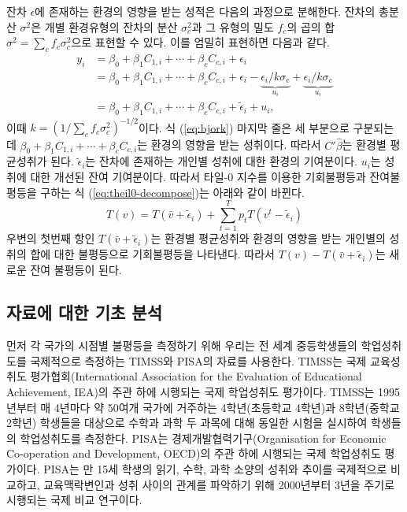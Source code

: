 잔차 $\epsilon$에 존재하는 환경의 영향을 받는 성적은 다음의 과정으로 분해한다.
잔차의 총분산 $\sigma ^2$은 개별 환경유형의 잔차의 분산 $\sigma _c^2$과 그 유형의 밀도 $f_c$의 곱의 합 $\sigma ^2 =  \sum _c f_c \sigma ^2 _c$으로 표현할 수 있다. 
이를 엄밀히 표현하면 다음과 같다.
\begin{equation}
\label{eq:bjork}
 \begin{aligned} y_{i} &= \beta _0 +  \beta _1 C_{1,i} + \cdots + \beta _c C_{c,i} + \epsilon_{i} \\ &= \beta _0 +  \beta _1 C_{1,i} + \cdots + \beta _c C_{c,i} +\epsilon_{i}-\underbrace{\epsilon_{i} / k \sigma_{c}}_{u_{i}}+\underbrace{\epsilon_{i} / k \sigma_{c}}_{u_{i}} \\ &= \beta _0 +  \beta _1 C_{1,i} + \cdots + \beta _c C_{c,i} +\widetilde{\epsilon}_{i}+u_{i}, \end{aligned}
\end{equation}
이때 $k = ( 1 / \sum _c f _c \sigma ^2 _c ) ^{-1/2}$이다.
식 (\ref{eq:bjork}) 마지막 줄은 세 부분으로 구분되는데 $\beta _0 +  \beta _1 C_{1,i} + \cdots + \beta _c C_{c,i}$는 환경의 영향을 받는 성취이다. 따라서 $C'\hat{\beta}$는 환경별 평균성취가 된다. $\widetilde{\epsilon}_{i}$는 잔차에 존재하는 개인별 성취에 대한 환경의 기여분이다. $u_i$는 성취에 대한 개선된 잔여 기여분이다.
따라서 타일-0 지수를 이용한 기회불평등과 잔여불평등을 구하는 식 (\ref{eq:theil0-decompose})는 아래와 같이 바뀐다.
\begin{equation}
 \label{eq:theil0-bjork}  
  T(v)=T(\bar{v}+\widetilde{\epsilon}_i)+ \sum_{t=1}^{T} p_{t} T\left(v^{t}-\widetilde{\epsilon}_i\right)
\end{equation}
우변의 첫번째 항인 $T(\bar{v}+\widetilde{\epsilon}_i)$는 환경별 평균성취와 환경의 영향을 받는 개인별의 성취의 합에 대한 불평등으로 기회불평등을 나타낸다.
따라서 $T(v) - T(\bar{v}+\widetilde{\epsilon}_i)$는 새로운 잔여 불평등이 된다.

\subsection{자료에 대한 기초 분석}

먼저 각 국가의 시점별 불평등을 측정하기 위해 우리는 전 세계 중등학생들의 학업성취도를 국제적으로 측정하는 TIMSS와 PISA의 자료를 사용한다.
TIMSS는 국제 교육성취도 평가협회(International Association for the Evaluation of Educational Achievement, IEA)의 주관 하에 시행되는 국제 학업성취도 평가이다.
TIMSS는 1995년부터 매 4년마다 약 50여개 국가에 거주하는 4학년(초등학교 4학년)과 8학년(중학교 2학년) 학생들을 대상으로 수학과 과학 두 과목에 대해 동일한 시험을 실시하여 학생들의 학업성취도를 측정한다.
PISA는 경제개발협력기구(Organisation for Economic Co-operation and Development, OECD)의 주관 하에 시행되는 국제 학업성취도 평가이다.
PISA는 만 15세 학생의 읽기, 수학, 과학 소양의 성취와 추이를 국제적으로 비교하고, 교육맥락변인과 성취 사이의 관계를 파악하기 위해 2000년부터 3년을 주기로 시행되는 국제 비교 연구이다.
 
